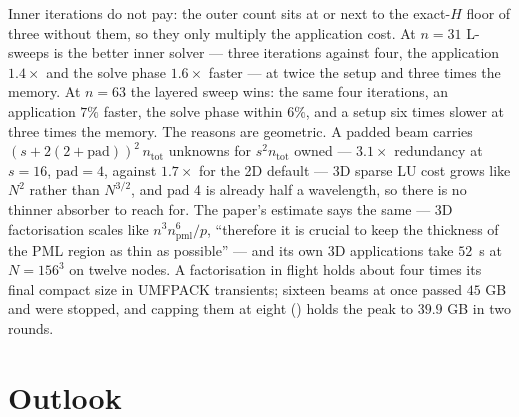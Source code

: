 \documentclass[11pt]{article}
\begin{document}
Inner iterations do not pay: the outer count sits at or next to the exact-$H$ floor of
three without them, so they only multiply the application cost. At $n=31$ L-sweeps is the
better inner solver --- three iterations against four, the application $1.4\times$ and the
solve phase $1.6\times$ faster --- at twice the setup and three times the memory. At
$n=63$ the layered sweep wins: the same four iterations, an application $7\%$ faster, the
solve phase within $6\%$, and a setup six times slower at three times the memory. The
reasons are geometric. A padded beam carries $(s+2(2+\mathrm{pad}))^2\,n_{\mathrm{tot}}$
unknowns for $s^2 n_{\mathrm{tot}}$ owned --- $3.1\times$ redundancy at $s=16$,
$\mathrm{pad}=4$, against $1.7\times$ for the 2D default --- 3D sparse LU cost grows like
$N^2$ rather than $N^{3/2}$, and pad 4 is already half a wavelength, so there is no thinner
absorber to reach for. The paper's estimate says the same --- 3D factorisation scales
like $n^3 n_{\mathrm{pml}}^6/p$, ``therefore it is crucial to keep the thickness of the
PML region as thin as possible'' --- and its own 3D applications take $52$~s at
$N=156^3$ on twelve nodes. A factorisation in flight holds about four times its final compact
size in UMFPACK transients; sixteen beams at once passed $45$ GB and were stopped, and
capping them at eight () holds the peak to $39.9$ GB in two rounds.

\section{Outlook}
\end{document}
